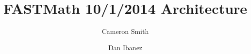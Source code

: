 \documentclass{beamer}
\begin{document}
\title{FASTMath 10/1/2014 Architecture}
\author{Cameron Smith \and Dan Ibanez}

\frame{\titlepage}


\end{document}
